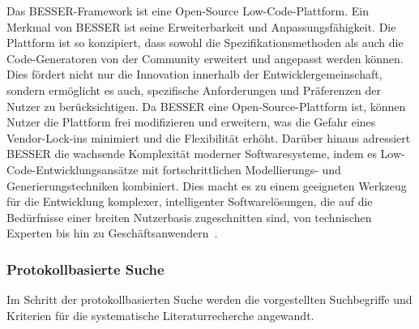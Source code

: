 


Das BESSER-Framework ist eine Open-Source Low-Code-Plattform. Ein Merkmal von BESSER ist seine Erweiterbarkeit 
und Anpassungsfähigkeit. Die Plattform ist so konzipiert, dass sowohl die 
Spezifikationsmethoden als auch die Code-Generatoren von der Community erweitert und angepasst werden können. Dies fördert 
nicht nur die Innovation innerhalb der Entwicklergemeinschaft, sondern ermöglicht es auch, spezifische Anforderungen und 
Präferenzen der Nutzer zu berücksichtigen. Da BESSER eine Open-Source-Plattform ist, können Nutzer die Plattform frei 
modifizieren und erweitern, was die Gefahr eines Vendor-Lock-ins minimiert und die Flexibilität erhöht.
Darüber hinaus adressiert BESSER die wachsende Komplexität moderner Softwaresysteme, indem es Low-Code-Entwicklungsansätze mit 
fortschrittlichen Modellierungs- und Generierungstechniken kombiniert. Dies macht es zu einem geeigneten Werkzeug für die Entwicklung 
komplexer, intelligenter Softwarelösungen, die auf die Bedürfnisse einer breiten Nutzerbasis 
zugeschnitten sind, von technischen Experten bis hin zu Geschäftsanwendern~\cite{alfonso2024building}.

\subsubsection{Protokollbasierte Suche}
Im Schritt der protokollbasierten Suche werden die vorgestellten Suchbegriffe und Kriterien für die systematische Literaturrecherche 
angewandt. 

